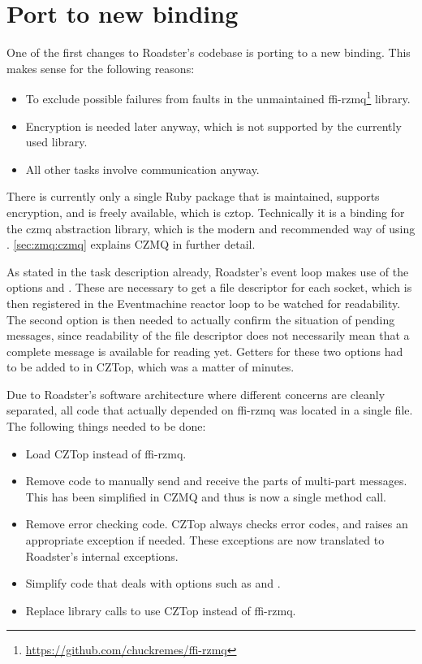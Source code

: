 \clearpage
\section{Port to new \zmq binding}\label{sec:approach:port}
One of the first changes to Roadster's codebase is porting to a new \zmq
binding. This makes sense for the following reasons:

\begin{itemize}
\item To exclude possible failures from faults in the unmaintained ffi-rzmq\footnote{\url{https://github.com/chuckremes/ffi-rzmq}} library.
\item Encryption is needed later anyway, which is not supported by the currently used library.
\item All other tasks involve \zmq communication anyway.
\end{itemize}

There is currently only a single Ruby package that is maintained, supports
encryption, and is freely available, which is \gls{cztop}. Technically it is a
binding for the \gls{czmq} abstraction library, which is the modern and recommended way of
using \zmq. \autoref{sec:zmq:czmq} explains CZMQ in further detail.

As stated in the task description already, Roadster's event loop makes use of
the \zmq options  and . These are necessary to get a
file descriptor for each \zmq socket, which is then registered in the
Eventmachine reactor loop to be watched for readability. The second option is
then needed to actually confirm the situation of pending messages, since
readability of the file descriptor does not necessarily mean that a complete message
is available for reading yet. Getters for these two options had to be
added to in CZTop, which was a matter of minutes.

Due to Roadster's software architecture where different concerns
are cleanly separated, all code that actually depended
on ffi-rzmq was located in a single file. The following
things needed to be done:

\begin{itemize}
\item Load CZTop instead of ffi-rzmq.
\item Remove code to manually send and receive the parts of multi-part messages. This has been simplified
in CZMQ and thus is now a single method call.
\item Remove error checking code. CZTop always checks error codes, and raises
an appropriate exception if needed. These exceptions are now translated to Roadster's internal exceptions.
\item Simplify code that deals with \zmq options such as  and .
\item Replace library calls to use CZTop instead of ffi-rzmq.
\end{itemize}

